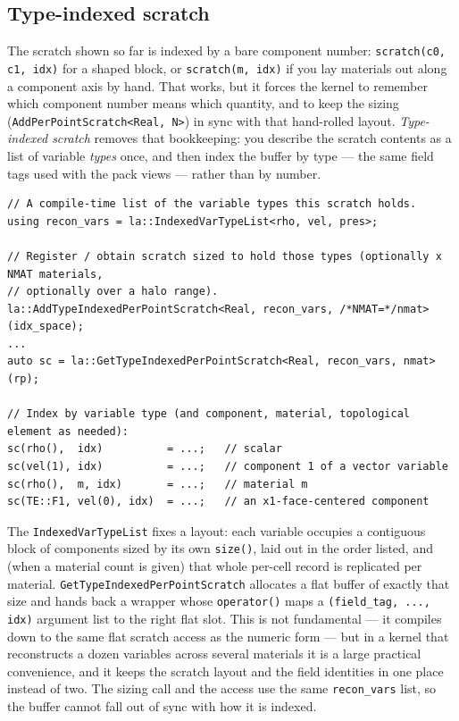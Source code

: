 \documentclass[11pt]{article}
\newcommand{\code}[1]{\lstinline[basicstyle=\ttfamily]|#1|}
\begin{document}
\subsection{Type-indexed scratch}
\label{sec:typed-scratch}

The scratch shown so far is indexed by a bare component number:
\code{scratch(c0, c1, idx)} for a shaped block, or \code{scratch(m, idx)} if you
lay materials out along a component axis by hand. That works, but it forces the
kernel to remember which component number means which quantity, and to keep the
sizing (\code{AddPerPointScratch<Real, N>}) in sync with that hand-rolled layout.
\emph{Type-indexed scratch} removes that bookkeeping: you describe the scratch
contents as a list of variable \emph{types} once, and then index the buffer by
type --- the same field tags used with the pack views --- rather than by number.

\begin{lstlisting}
// A compile-time list of the variable types this scratch holds.
using recon_vars = la::IndexedVarTypeList<rho, vel, pres>;

// Register / obtain scratch sized to hold those types (optionally x NMAT materials,
// optionally over a halo range).
la::AddTypeIndexedPerPointScratch<Real, recon_vars, /*NMAT=*/nmat>(idx_space);
...
auto sc = la::GetTypeIndexedPerPointScratch<Real, recon_vars, nmat>(rp);

// Index by variable type (and component, material, topological element as needed):
sc(rho(),  idx)          = ...;   // scalar
sc(vel(1), idx)          = ...;   // component 1 of a vector variable
sc(rho(),  m, idx)       = ...;   // material m
sc(TE::F1, vel(0), idx)  = ...;   // an x1-face-centered component
\end{lstlisting}

The \code{IndexedVarTypeList} fixes a layout: each variable occupies a contiguous
block of components sized by its own \code{size()}, laid out in the order listed,
and (when a material count is given) that whole per-cell record is replicated per
material. \code{GetTypeIndexedPerPointScratch} allocates a flat buffer of exactly
that size and hands back a wrapper whose \code{operator()} maps a
\code{(field_tag, ..., idx)} argument list to the right flat slot. This is not
fundamental ---
it compiles down to the same flat scratch access as the numeric form --- but in a
kernel that reconstructs a dozen variables across several materials it is a large
practical convenience, and it keeps the scratch layout and the field identities in
one place instead of two. The sizing call and the access use the same
\code{recon_vars} list, so the buffer cannot fall out of sync with how it is
indexed.
\end{document}
